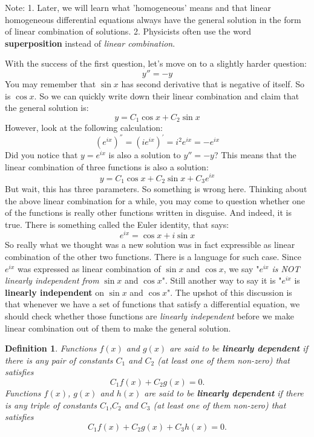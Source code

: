 \documentclass[12pt]{report}
\newtheorem{df}{Definition}[section]
\begin{document}
Note: 1. Later, we will learn what 'homogeneous' means and that linear homogeneous differential equations always have the general solution in the form of linear combination of solutions. 2. Physicists often use the word \textbf{superposition} instead of \textit{linear combination}.

With the success of the first question, let's move on to a slightly harder question:
$$y''=-y$$
You may remember that $\sin x$ has second derivative that is negative of itself. So is $\cos x$. So we can quickly write down their linear combination and claim that the general solution is:
$$y= C_1 \cos x + C_2 \sin x$$
However, look at the following calculation:
$$\left(e^{ix}\right)^{''} = \left(i e^{ix}\right)^{'}=i^2 e^{ix} = -e^{ix}$$
Did you notice that $y=e^{ix}$ is also a solution to $y''=-y$?
This means that the linear combination of three functions is also a solution:
$$y= C_1 \cos x + C_2 \sin x +C_3 e^{ix}$$
But wait, this has three parameters. So something is wrong here. Thinking about the above linear combination for a while, you may come to question whether one of the functions is really other functions written in disguise. And indeed, it is true. There is something called the Euler identity, that says:
$$e^{ix}=\cos x + i \sin x$$
So really what we thought was a new solution was in fact expressible as linear combination of the other two functions. There is a language for such case. Since $e^{ix}$ was expressed as linear combination of $\sin x$ and $\cos x$, we say "$e^{ix}$ \textit{is NOT linearly independent from} $\sin x$ and $\cos x$". Still another way to say it is "$e^{ix}$ is \textbf{linearly independent} on $\sin x$ and $\cos x$".
The upshot of this discussion is that whenever we have a set of functions that satisfy a differential equation, we should check whether those functions are \textit{linearly independent} before we make linear combination out of them to make the general solution.

\begin{df}
	Functions $f(x)$ and $g(x)$ are said to be \textbf{linearly dependent} if there is any pair of constants $C_1$ and $C_2$ (at least one of them non-zero) that satisfies
		$$C_1 f(x) + C_2 g(x) =0.$$
	Functions $f(x)$, $g(x)$ and $h(x)$ are said to be \textbf{linearly dependent} if there is any triple of constants $C_1$,$C_2$ and $C_3$ (at least one of them non-zero) that satisfies
		$$C_1 f(x) + C_2 g(x)+ C_3 h(x) =0.$$
\end{df}
\end{document}
